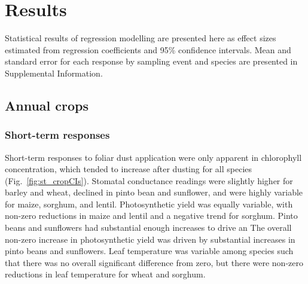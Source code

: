 \documentclass{svjour3}
\begin{document}
\section{Results} 

Statistical results of regression modelling are presented here as effect sizes estimated from regression coefficients and 95\% confidence intervals. 
Mean and standard error for each response by sampling event and species are presented in Supplemental Information. 

\subsection{Annual crops}

\subsubsection{Short-term responses}

Short-term responses to foliar dust application were only apparent in chlorophyll concentration, which tended to increase after dusting for all species (Fig.~\ref{fig:st_cropCIs}). 
Stomatal conductance readings were slightly higher for barley and wheat, declined in pinto bean and sunflower, and were highly variable for maize, sorghum, and lentil. 
Photosynthetic yield was equally variable, with non-zero reductions in maize and lentil and a negative trend for sorghum. 
Pinto beans and sunflowers had substantial enough increases to drive an The overall non-zero increase in photosynthetic yield was driven by substantial increases in pinto beans and sunflowers. 
Leaf temperature was variable among species such that there was no overall significant difference from zero, but there were non-zero reductions in leaf temperature for wheat and sorghum.  
\end{document}
